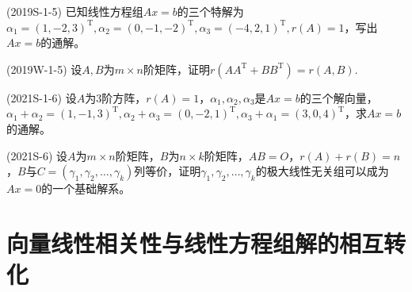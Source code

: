 \documentclass[lang=cn,newtx,10pt,scheme=chinese]{elegantbook}
\begin{document}
\begin{exercise}
    (2019S-1-5) 已知线性方程组$Ax=b$的三个特解为$\alpha_1 = (1,-2,3)^\mathrm{T},\alpha_2 = (0,-1,-2)^\mathrm{T},\alpha_3 = (-4,2,1)^\mathrm{T},r(A) = 1$，写出$Ax=b$的通解。
\end{exercise}

\begin{exercise}
    (2019W-1-5) 设$A,B$为$m \times n$阶矩阵，证明$r(A A^\mathrm{T} + B B^\mathrm{T}) = r(A,B)$.
\end{exercise}

\begin{exercise}
    (2021S-1-6) 设$A$为3阶方阵，$r(A)=1$，$\alpha_1,\alpha_2,\alpha_3$是$Ax=b$的三个解向量，$\alpha_1 + \alpha_2 = (1,-1,3)^\mathrm{T},\alpha_2 + \alpha_3 = (0,-2,1)^\mathrm{T},\alpha_3 + \alpha_1 = (3,0,4)^\mathrm{T}$，求$Ax=b$的通解。
\end{exercise}

\begin{exercise}
    (2021S-6) 设$A$为$m \times n$阶矩阵，$B$为$n \times k$阶矩阵，$AB=O$，$r(A) + r(B) = n$，$B$与$C=(\gamma_1,\gamma_2,\dots,\gamma_k)$列等价，证明$\gamma_1,\gamma_2,\dots,\gamma_k$的极大线性无关组可以成为$Ax=0$的一个基础解系。
\end{exercise}

\section{向量线性相关性与线性方程组解的相互转化}
\end{document}
